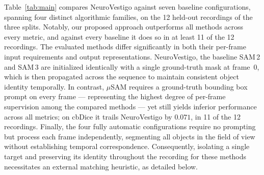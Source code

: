 \documentclass[11pt,a4paper]{article}
\begin{document}
Table~\ref{tab:main} compares NeuroVestigo against seven baseline
configurations, spanning four distinct algorithmic families, on the 12
held-out recordings of the three splits.
Notably, our proposed approach outperforms all methods across every metric,
and against every baseline it does so in at least 11 of the 12 recordings.
The evaluated methods differ significantly in both their per-frame input
requirements and output representations. NeuroVestigo, the baseline SAM\,2 and
SAM\,3 are initialized identically with a single ground-truth mask at
frame~0, which is then propagated across the sequence to maintain consistent
object identity temporally. In contrast, $\mu$SAM requires a ground-truth
bounding box prompt on every frame --- representing the highest degree of
per-frame supervision among the compared methods --- yet still yields
inferior performance across all metrics; on cbDice it trails NeuroVestigo by
$0.071$, in 11 of the 12 recordings. Finally, the four fully automatic
configurations require no prompting but process each frame independently,
segmenting all objects in the field of view without establishing temporal
correspondence. Consequently, isolating a single target and preserving its
identity throughout the recording for these methods necessitates an external
matching heuristic, as detailed below.
\end{document}
